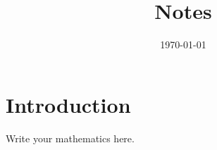 \documentclass[11pt]{article}
\title{Notes}
\author{}
\date{\today}
\begin{document}
\maketitle

\section{Introduction}

Write your mathematics here.
\end{document}
